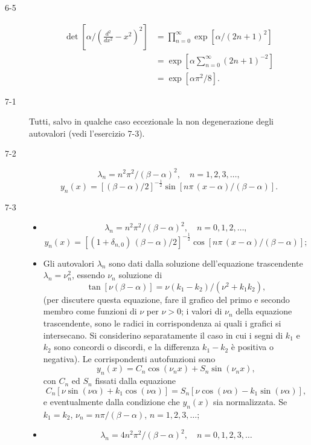 \documentclass[11pt, a4paper]{book}
\numberwithin{equation}{section}
\begin{document}
\begin{description}
\item[6-5]
\begin{align*}
  \det\!\left[\alpha\Big/\!\left(\frac{d^2}{dx^2}-x^2\right)^2\right]
  &= \prod_{n=0}^{\infty} \exp\!\left[\alpha/(2n+1)^2\right]\\
  &= \exp\!\left[\alpha\sum_{n=0}^{\infty}(2n+1)^{-2}\right]\\
  &= \exp\!\left[\alpha\pi^2/8\right].
\end{align*}

\item[7-1] Tutti, salvo in qualche caso eccezionale la non degenerazione degli autovalori (vedi l'esercizio 7-3).

\item[7-2]
\[
  \lambda_n = n^2\pi^2/(\beta-\alpha)^2,\quad n=1,2,3,\ldots,
\]
\[
  y_n(x) = \left[(\beta-\alpha)/2\right]^{-\frac{1}{2}}
  \sin\!\left[n\pi\,(x-\alpha)/(\beta-\alpha)\right].
\]

\item[7-3]
\begin{itemize}
  \item[i)]
  \[
    \lambda_n = n^2\pi^2/(\beta-\alpha)^2,\quad n=0,1,2,\ldots,
  \]
  \[
    y_n(x) = \left[(1+\delta_{n,0})\,(\beta-\alpha)/2\right]^{-\frac{1}{2}}
    \cos\!\left[n\pi\,(x-\alpha)/(\beta-\alpha)\right];
  \]
  \item[ii)] Gli autovalori $\lambda_n$ sono dati dalla soluzione dell'equazione trascendente
  $\lambda_n = \nu_n^2$, essendo $\nu_n$ soluzione di
  \[
    \tan\!\left[\nu(\beta-\alpha)\right] = \nu(k_1-k_2)/(\nu^2+k_1 k_2),
  \]
  (per discutere questa equazione, fare il grafico del primo e secondo membro come funzioni di $\nu$ per $\nu>0$; i valori di $\nu_n$ della equazione trascendente, sono le radici in corrispondenza ai quali i grafici si intersecano. Si considerino separatamente il caso in cui i segni di $k_1$ e $k_2$ sono concordi o discordi, e la differenza $k_1-k_2$ è positiva o negativa). Le corrispondenti autofunzioni sono
  \[
    y_n(x) = C_n \cos(\nu_n x) + S_n \sin(\nu_n x),
  \]
  con $C_n$ ed $S_n$ fissati dalla equazione
  \[
    C_n\left[\nu\sin(\nu\alpha)+k_1\cos(\nu\alpha)\right]
    = S_n\left[\nu\cos(\nu\alpha)-k_1\sin(\nu\alpha)\right],
  \]
  e eventualmente dalla condizione che $y_n(x)$ sia normalizzata. Se $k_1=k_2$, $\nu_n = n\pi/(\beta-\alpha)$, $n=1,2,3,\ldots$;
  \item[iii)]
  \[
    \lambda_n = 4n^2\pi^2/(\beta-\alpha)^2,\quad n=0,1,2,3,\ldots
  \]
\end{itemize}


\end{description}
\end{document}
